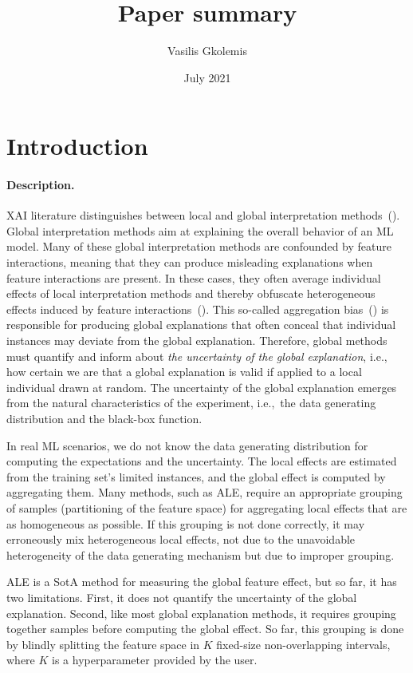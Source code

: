 \documentclass{article}
\title{Paper summary}
\author{Vasilis Gkolemis}
\date{July 2021}
\begin{document}
\maketitle

\section{Introduction}

\paragraph{Description.}

XAI literature distinguishes between local and global interpretation methods~(\cite{Molnar2020}). Global interpretation methods aim at explaining the overall behavior of an ML model. Many of these global interpretation methods are confounded by feature interactions, meaning that they can produce misleading explanations when feature interactions are present. In these cases, they often average individual effects of local interpretation methods and thereby obfuscate heterogeneous effects induced by feature interactions~(\cite{Herbinger2022}). This so-called aggregation bias~(\cite{Mehrabi2019}) is responsible for producing global explanations that often conceal that individual instances may deviate from the global explanation. Therefore, global methods must quantify and inform about \textit{the uncertainty of the global explanation}, i.e., how certain we are that a global explanation is valid if applied to a local individual drawn at random. The uncertainty of the global explanation emerges from the natural characteristics of the experiment, i.e.,~the data generating distribution and the black-box function.

In real ML scenarios, we do not know the data generating distribution for computing the expectations and the uncertainty. The local effects are estimated from the training set's limited instances, and the global effect is computed by aggregating them. Many methods, such as ALE, require an appropriate grouping of samples (partitioning of the feature space) for aggregating local effects that are as homogeneous as possible. If this grouping is not done correctly, it may erroneously mix heterogeneous local effects, not due to the unavoidable heterogeneity of the data generating mechanism but due to improper grouping.

ALE is a SotA method for measuring the global feature effect, but so far, it has two limitations. First, it does not quantify the uncertainty of the global explanation. Second, like most global explanation methods, it requires grouping together samples before computing the global effect. So far, this grouping is done by blindly splitting the feature space in \(K\) fixed-size non-overlapping intervals, where \(K\) is a hyperparameter provided by the user.
\end{document}
